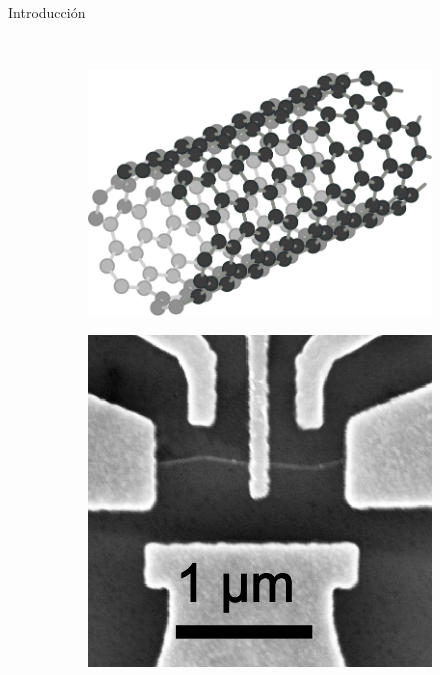 \documentclass{beamer}
\begin{document}
\begin{frame}{Introducción}
\begin{figure}
			\\
			\begin{subfigure}[b]{0.2\textwidth}
				\includegraphics[width=\textwidth]{cnt_structure.pdf}
				\caption{}
				\label{fig:cnt_struct}
			\end{subfigure}
			\begin{subfigure}[b]{0.2\textwidth}
				\includegraphics[width=\textwidth]{cnt_image.png}
				\caption{}
				\label{fig:cnt_image}
			\end{subfigure}
			\begin{subfigure}[b]{0.2\textwidth}

\end{subfigure}
\end{figure}
\end{frame}
\end{document}
